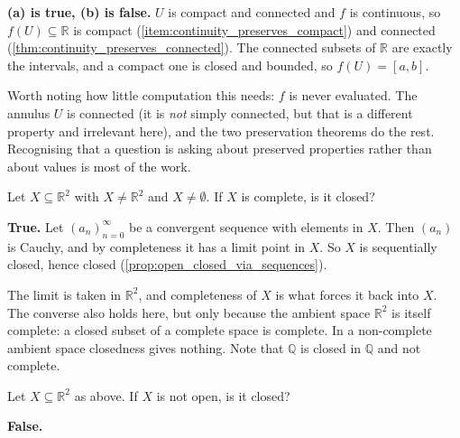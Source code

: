 \begin{answer}
\textbf{(a) is true, (b) is false.} $U$ is compact and connected and $f$ is continuous, so
$f(U) \subseteq \mathbb{R}$ is compact (\cref{item:continuity_preserves_compact}) and connected
(\cref{thm:continuity_preserves_connected}). The connected subsets of $\mathbb{R}$ are exactly
the intervals, and a compact one is closed and bounded, so $f(U) = [a,b]$.
\end{answer}

\begin{ainote}
Worth noting how little computation this needs: $f$ is never evaluated. The annulus $U$ is
connected (it is \emph{not} simply connected, but that is a different property and irrelevant
here), and the two preservation theorems do the rest. Recognising that a question
is asking about preserved properties rather than about values is most of the work.
\end{ainote}

\begin{question}
\label{q:quiz_q2}
Let $X \subseteq \mathbb{R}^2$ with $X \neq \mathbb{R}^2$ and $X \neq \emptyset$. If $X$ is
complete, is it closed?
\end{question}

\begin{answer}
\textbf{True.} Let $(a_n)_{n=0}^\infty$ be a convergent sequence with elements in $X$. Then
$(a_n)$ is Cauchy, and by completeness it has a limit point in $X$. So $X$ is sequentially
closed, hence closed (\cref{prop:open_closed_via_sequences}).
\end{answer}

\begin{ainote}
The limit is taken in $\mathbb{R}^2$, and completeness of $X$ is what forces it back into $X$.
The converse also holds here, but only because the ambient space $\mathbb{R}^2$ is itself
complete: a closed subset of a complete space is complete. In a non-complete ambient space
closedness gives nothing. Note that $\mathbb{Q}$ is closed in $\mathbb{Q}$ and not complete.
\end{ainote}

\begin{question}
\label{q:quiz_q3}
Let $X \subseteq \mathbb{R}^2$ as above. If $X$ is not open, is it closed?
\end{question}

\begin{answer}
\textbf{False.}
\end{answer}

